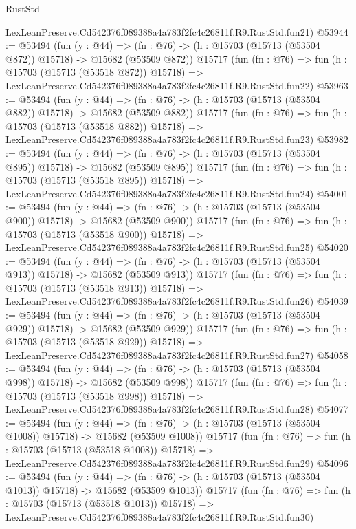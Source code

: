 \begin{lexlean}{RustStd}
\begin{coremodule}
    LexLeanPreserve.Cd542376f089388a4a783f2fc4c26811f.R9.RustStd.fun21)
@53944 := @53494
    (fun (y : @44) =>
    (fn : @76) -> (h : @15703 (@15713 (@53504 @872)) @15718) -> @15682 (@53509 @872))
    @15717
    (fun (fn : @76) =>
    fun (h : @15703 (@15713 (@53518 @872)) @15718) =>
    LexLeanPreserve.Cd542376f089388a4a783f2fc4c26811f.R9.RustStd.fun22)
@53963 := @53494
    (fun (y : @44) =>
    (fn : @76) -> (h : @15703 (@15713 (@53504 @882)) @15718) -> @15682 (@53509 @882))
    @15717
    (fun (fn : @76) =>
    fun (h : @15703 (@15713 (@53518 @882)) @15718) =>
    LexLeanPreserve.Cd542376f089388a4a783f2fc4c26811f.R9.RustStd.fun23)
@53982 := @53494
    (fun (y : @44) =>
    (fn : @76) -> (h : @15703 (@15713 (@53504 @895)) @15718) -> @15682 (@53509 @895))
    @15717
    (fun (fn : @76) =>
    fun (h : @15703 (@15713 (@53518 @895)) @15718) =>
    LexLeanPreserve.Cd542376f089388a4a783f2fc4c26811f.R9.RustStd.fun24)
@54001 := @53494
    (fun (y : @44) =>
    (fn : @76) -> (h : @15703 (@15713 (@53504 @900)) @15718) -> @15682 (@53509 @900))
    @15717
    (fun (fn : @76) =>
    fun (h : @15703 (@15713 (@53518 @900)) @15718) =>
    LexLeanPreserve.Cd542376f089388a4a783f2fc4c26811f.R9.RustStd.fun25)
@54020 := @53494
    (fun (y : @44) =>
    (fn : @76) -> (h : @15703 (@15713 (@53504 @913)) @15718) -> @15682 (@53509 @913))
    @15717
    (fun (fn : @76) =>
    fun (h : @15703 (@15713 (@53518 @913)) @15718) =>
    LexLeanPreserve.Cd542376f089388a4a783f2fc4c26811f.R9.RustStd.fun26)
@54039 := @53494
    (fun (y : @44) =>
    (fn : @76) -> (h : @15703 (@15713 (@53504 @929)) @15718) -> @15682 (@53509 @929))
    @15717
    (fun (fn : @76) =>
    fun (h : @15703 (@15713 (@53518 @929)) @15718) =>
    LexLeanPreserve.Cd542376f089388a4a783f2fc4c26811f.R9.RustStd.fun27)
@54058 := @53494
    (fun (y : @44) =>
    (fn : @76) -> (h : @15703 (@15713 (@53504 @998)) @15718) -> @15682 (@53509 @998))
    @15717
    (fun (fn : @76) =>
    fun (h : @15703 (@15713 (@53518 @998)) @15718) =>
    LexLeanPreserve.Cd542376f089388a4a783f2fc4c26811f.R9.RustStd.fun28)
@54077 := @53494
    (fun (y : @44) =>
    (fn : @76) -> (h : @15703 (@15713 (@53504 @1008)) @15718) -> @15682 (@53509 @1008))
    @15717
    (fun (fn : @76) =>
    fun (h : @15703 (@15713 (@53518 @1008)) @15718) =>
    LexLeanPreserve.Cd542376f089388a4a783f2fc4c26811f.R9.RustStd.fun29)
@54096 := @53494
    (fun (y : @44) =>
    (fn : @76) -> (h : @15703 (@15713 (@53504 @1013)) @15718) -> @15682 (@53509 @1013))
    @15717
    (fun (fn : @76) =>
    fun (h : @15703 (@15713 (@53518 @1013)) @15718) =>
    LexLeanPreserve.Cd542376f089388a4a783f2fc4c26811f.R9.RustStd.fun30)

\end{coremodule}
\end{lexlean}
